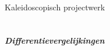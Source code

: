 \begin{titlepage}
    \begin{center}
        \ \
        \ \\
        \ \\
        \ \\
        \ \\
        \ \\
        \ \\
        \ \\
        \ \\
        \ \\
        \ \\
        \ \\
        \Large{K{\sc aleidoscopisch projectwerk}}
        \ \\
        \ \\
        \ \\
        \huge{\bf{\em Differentievergelijkingen}}
        \ \\
        \ \\
        \ \\
        \ \\
        \ \\

\end{center}
\end{titlepage}
